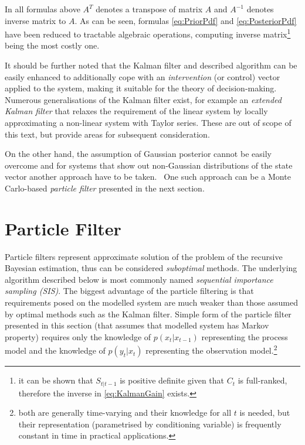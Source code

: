In all formulas above \(A^T\) denotes a transpose of matrix \(A\) and \(A^{-1}\) denotes inverse
matrix to \(A\). As can be seen, formulas \eqref{eq:PriorPdf} and \eqref{eq:PosteriorPdf} have
been reduced to tractable algebraic operations, computing inverse matrix\footnote{it can be shown
that \(S_{t|t-1}\) is positive definite given that \(C_t\) is full-ranked,
therefore the inverse in \eqref{eq:KalmanGain} exists.} being the most costly one.

It should be further noted that the Kalman filter and described algorithm can be easily enhanced to
additionally cope with an \emph{intervention} (or control) vector applied to the system, making it
suitable for the theory of decision-making. Numerous generalisations of the Kalman filter exist, for
example an \emph{extended Kalman filter} that relaxes the requirement of the linear system by locally
approximating a non-linear system with Taylor series. These are out of scope of this
text, but provide areas for subsequent consideration.

On the other hand, the assumption of Gaussian posterior {\pdf} cannot be easily overcome and for
systems that show out non-Gaussian distributions of the state vector another approach have to be
taken.~\cite{AruMasGor:02} One such approach can be a Monte Carlo-based \emph{particle filter}
presented in the next section.

\section{Particle Filter} \label{sec:ParticleFilter}

Particle filters represent approximate solution of the problem of the recursive Bayesian estimation,
thus can be considered \emph{suboptimal} methods. The underlying algorithm described below is most
commonly named \emph{sequential importance sampling (SIS)}. The biggest advantage of the particle filtering
is that requirements posed on the modelled system are much weaker than those assumed by optimal methods
such as the Kalman filter. Simple form of the particle filter presented in this section (that assumes that
modelled system has Markov property) requires only the knowledge of {\pdf} \(p(x_t|x_{t-1})\)
representing the process model and the knowledge of \(p(y_t|x_t)\) representing the observation
model.\footnote{both {\pdfs} are generally time-varying and their knowledge for all \(t\) is needed,
but their representation (parametrised by conditioning variable) is frequently constant in time in
practical applications.}

